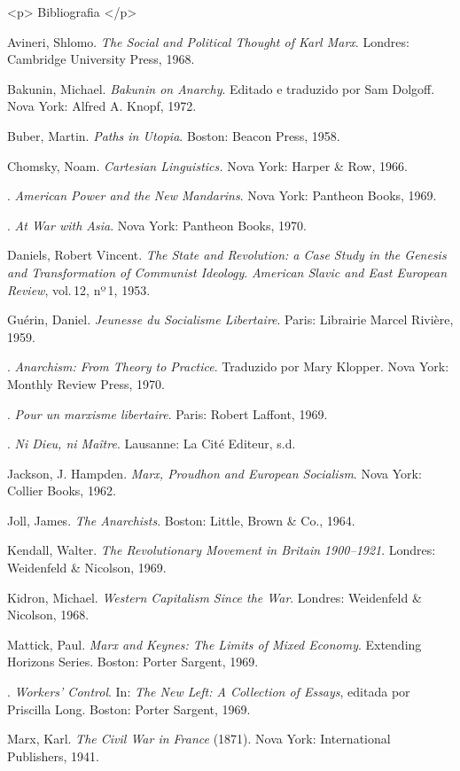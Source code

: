<p> Bibliografia </p>

{Avineri}, Shlomo. \textit{The Social and Political Thought of Karl
Marx}. Londres: Cambridge University Press, 1968.

{Bakunin}, Michael. \textit{Bakunin on Anarchy}. Editado e traduzido por
Sam Dolgoff. Nova York: Alfred A. Knopf, 1972.

{Buber}, Martin. \textit{Paths in Utopia}. Boston: Beacon Press, 1958. 

{Chomsky}, Noam. \textit{Cartesian Linguistics.} Nova York: Harper \&
Row, 1966. 

\titidem. \textit{American Power and the New Mandarins}. Nova York:
Pantheon Books, 1969.

\titidem. \textit{At War with Asia}. Nova York: Pantheon Books, 1970. 

{Daniels}, Robert Vincent. \textit{The State and Revolution: a Case
Study in the Genesis and Transformation of Communist Ideology}.
\textit{American Slavic and East European Review}, vol.\,12,
nº\,1, 1953.

{Guérin}, Daniel. \textit{Jeunesse du Socialisme Libertaire}. Paris:
Librairie Marcel Rivière, 1959.

\titidem. \textit{Anarchism: From Theory to Practice}. Traduzido por Mary
Klopper. Nova York: Monthly Review Press, 1970.

\titidem. \textit{Pour un marxisme libertaire}. Paris: Robert Laffont,
1969. 

\titidem. \textit{Ni Dieu, ni Maître}. Lausanne: La Cité Editeur, s.d. 

{Jackson}, J. Hampden. \textit{Marx, Proudhon and European Socialism}.
Nova York: Collier Books, 1962.

{Joll}, James. \textit{The Anarchists}. Boston: Little, Brown \& Co.,
1964. 

{Kendall}, Walter. \textit{The Revolutionary Movement in
Britain} \textit{1900--1921}. Londres: Weidenfeld \& Nicolson, 1969.

{Kidron}, Michael. \textit{Western Capitalism Since the War}. Londres:
Weidenfeld \& Nicolson, 1968.

{Mattick}, Paul. \textit{Marx and Keynes: The Limits of Mixed Economy}.
Extending Horizons Series. Boston: Porter Sargent, 1969.

\titidem. \textit{Workers’ Control}. In: \textit{The New Left: A Collection
of Essays}, editada por Priscilla Long. Boston: Porter Sargent, 1969.

{Marx}, Karl. \textit{The Civil War in France} (1871). Nova York:
International Publishers, 1941.

